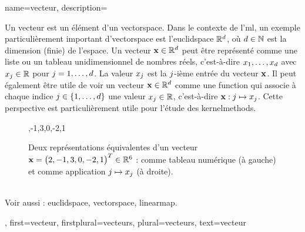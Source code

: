 {name={vecteur},
	description={
		Un vecteur est un élément d’un \gls{vectorspace}. 
		Dans le contexte de l’\gls{ml}, un exemple particulièrement important d’\gls{vectorspace} 
		est l’\gls{euclidspace} $\mathbb{R}^{d}$, où $d \in \mathbb{N}$ 
		est la dimension (finie) de l’espace. Un vecteur ${\bf x} \in \mathbb{R}^{d}$ 
		peut être représenté comme une liste ou un tableau unidimensionnel de nombres réels, c’est-à-dire 
		$x_1, \ldots, x_{d}$ avec $x_j \in \mathbb{R}$ pour 
		$j = 1, \ldots, d$. La valeur $x_j$ est la $j$-ième entrée du vecteur ${\bf x}$. Il peut également être utile de voir un vecteur ${\bf x} \in \mathbb{R}^{d}$ 
		comme une \gls{function} qui associe à chaque indice $j \in \{1, \ldots, d\}$ 
		une valeur $x_j \in \mathbb{R}$, c’est-à-dire ${\bf x}: j \mapsto x_j$. 
		Cette perspective est particulièrement utile pour l’étude des \glspl{kernelmethod}.
		\begin{figure}[htbp]
			\begin{minipage}[c]{0.48\textwidth}
				,-1,3,0,-2,1
			\end{minipage}
			\hfill
			\begin{minipage}{0.48\textwidth}
				\centering
			\end{minipage}
			\caption{Deux représentations équivalentes d’un vecteur ${\bf x}= \big( 2,-1,3,0,-2,1 \big)^{T} \in \mathbb{R}^{6}$ :
				comme tableau numérique (à gauche) et comme application $j \mapsto x_j$ (à droite).}
			\label{fig:vector-function-dual_dict}
		\end{figure}
		\\
		Voir aussi : \gls{euclidspace}, \gls{vectorspace}, \gls{linearmap}.},
	first={vecteur},
	firstplural={vecteurs},
	plural={vecteurs},
	text={vecteur}
}

